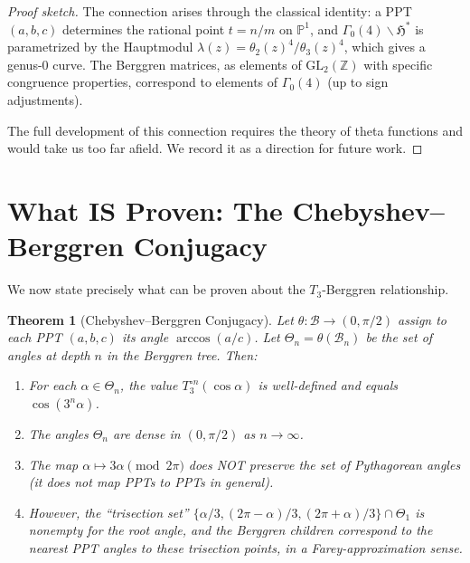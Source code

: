 \documentclass[12pt]{amsart}
\newtheorem{theorem}{Theorem}[section]
\theoremstyle{definition}
\theoremstyle{remark}
\newcommand{\ZZ}{\mathbb{Z}}
\newcommand{\PP}{\mathbb{P}}
\begin{document}
\begin{proof}[Proof sketch]
The connection arises through the classical identity: a PPT
$(a,b,c)$ determines the rational point $t = n/m$ on $\PP^1$,
and $\Gamma_0(4)\backslash\mathfrak{H}^*$ is parametrized by the
Hauptmodul $\lambda(z) = \theta_2(z)^4/\theta_3(z)^4$, which gives
a genus-0 curve.  The Berggren matrices, as elements of
$\mathrm{GL}_2(\ZZ)$ with specific congruence properties, correspond
to elements of $\Gamma_0(4)$ (up to sign adjustments).

The full development of this connection requires the theory of theta
functions and would take us too far afield.  We record it as a
direction for future work.
\end{proof}


\section{What IS Proven: The Chebyshev--Berggren Conjugacy}\label{sec:conjugacy}

We now state precisely what can be proven about the $T_3$-Berggren
relationship.

\begin{theorem}[Chebyshev--Berggren Conjugacy]\label{thm:conjugacy}
Let $\theta\colon\mathcal{B}\to(0,\pi/2)$ assign to each PPT
$(a,b,c)$ its angle $\arccos(a/c)$.  Let $\Theta_n = \theta(\mathcal{B}_n)$
be the set of angles at depth $n$ in the Berggren tree.  Then:
\begin{enumerate}[label=(\roman*)]
  \item For each $\alpha\in\Theta_n$, the value $T_3^{\circ n}(\cos\alpha)$
        is well-defined and equals $\cos(3^n\alpha)$.
  \item The angles $\Theta_n$ are dense in $(0,\pi/2)$ as $n\to\infty$.
  \item The map $\alpha\mapsto 3\alpha \pmod{2\pi}$ does NOT preserve
        the set of Pythagorean angles (it does not map PPTs to PPTs
        in general).
  \item However, the ``trisection set'' $\{\alpha/3, (2\pi-\alpha)/3,
        (2\pi+\alpha)/3\}\cap\Theta_1$ is nonempty for the root angle,
        and the Berggren children correspond to the \emph{nearest} PPT
        angles to these trisection points, in a Farey-approximation
        sense.
\end{enumerate}
\end{theorem}
\end{document}
